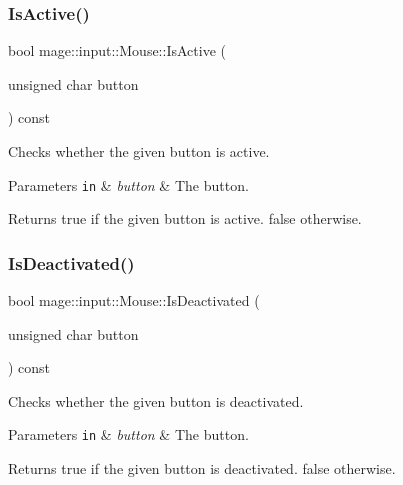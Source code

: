 \subsubsection{\texorpdfstring{Is\+Active()}{IsActive()}}
{\footnotesize\ttfamily bool mage\+::input\+::\+Mouse\+::\+Is\+Active (\begin{DoxyParamCaption}\item[{unsigned char}]{button }\end{DoxyParamCaption}) const\hspace{0.3cm}{\ttfamily [noexcept]}}

Checks whether the given button is active.


\begin{DoxyParams}[1]{Parameters}
\mbox{\tt in}  & {\em button} & The button. \\
\hline
\end{DoxyParams}
\begin{DoxyReturn}{Returns}
{\ttfamily true} if the given button is active. {\ttfamily false} otherwise. 
\end{DoxyReturn}
\mbox{\label{classmage_1_1input_1_1_mouse_acd07880cd7af2afa704de7500a64eb3c}} 
\subsubsection{\texorpdfstring{Is\+Deactivated()}{IsDeactivated()}}
{\footnotesize\ttfamily bool mage\+::input\+::\+Mouse\+::\+Is\+Deactivated (\begin{DoxyParamCaption}\item[{unsigned char}]{button }\end{DoxyParamCaption}) const\hspace{0.3cm}{\ttfamily [noexcept]}}

Checks whether the given button is deactivated.


\begin{DoxyParams}[1]{Parameters}
\mbox{\tt in}  & {\em button} & The button. \\
\hline
\end{DoxyParams}
\begin{DoxyReturn}{Returns}
{\ttfamily true} if the given button is deactivated. {\ttfamily false} otherwise. 
\end{DoxyReturn}
\mbox{\label{classmage_1_1input_1_1_mouse_afcee4f0ee845d46b71fbc8a29879b873}} 
